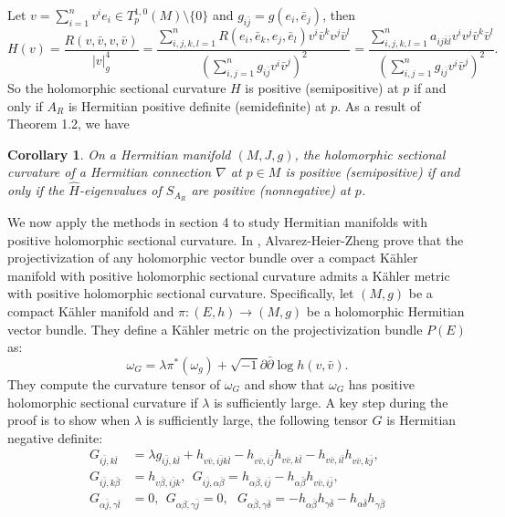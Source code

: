\documentclass[10pt,reqno]{amsart}
\newtheorem{cor}[thm]{Corollary}
\theoremstyle{definition}
\begin{document}
Let $v=\sum_{i=1}^n v^ie_i \in T_p^{1,0}(M)\setminus \{0\}$ and $g_{i\bar{j}}=g(e_i,\bar{e}_j)$, then 
$$H(v)=\dfrac{R(v,\bar{v},v,\bar{v})}{|v|_g^4}=\dfrac{\sum_{i,j,k,l=1}^nR(e_i,\bar{e}_k,e_j,\bar{e}_l)v^i\bar{v}^kv^j\bar{v}^l}{(\sum_{i,j=1}^n g_{i\bar{j}}v^i\bar{v}^j)^2}=\dfrac{\sum_{i,j,k,l=1}^na_{ij\bar{k}\bar{l}}v^iv^j\bar{v}^k\bar{v}^l}{(\sum_{i,j=1}^n g_{i\bar{j}}v^i\bar{v}^j)^2}.$$
So the holomorphic sectional curvature $H$ is positive (semipositive) at $p$ if and only if $A_R$ is Hermitian positive definite (semidefinite) at $p$.
As a result of Theorem 1.2, we have 
\begin{cor}
On a Hermitian manifold $(M,J,g)$, the holomorphic sectional curvature of a Hermitian connection $\nabla$ at $p\in M$  is positive (semipositive) if and only if the $\hat{H}$-eigenvalues of $S_{A_R}$ are positive (nonnegative) at $p$.
\end{cor}
We now apply the methods in section 4 to study Hermitian manifolds with positive holomorphic sectional curvature. In \cite{AHZ}, Alvarez-Heier-Zheng prove that the projectivization of any holomorphic vector bundle over a compact K\"ahler manifold with positive holomorphic sectional curvature admits a K\"ahler metric with positive holomorphic sectional curvature. Specifically, let $(M,g)$ be a compact K\"ahler manifold and $\pi: (E,h)\to (M,g)$ be a holomorphic Hermitian vector bundle. They define a K\"ahler metric on the projectivization bundle $P(E)$ as: $$\omega_G=\lambda \pi^*(\omega_g)+\sqrt{-1}\partial\bar{\partial}\log h(v,\bar{v}).$$ 
They compute the curvature tensor of $\omega_G$ and show that $\omega_G$ has positive holomorphic sectional curvature if $\lambda$ is sufficiently large. A key step during the proof is to show when $\lambda$ is sufficiently large, the following tensor $G$ is Hermitian negative definite:
\begin{align*} G_{i\bar{j},k\bar{l}}&=\lambda g_{i\bar{j},k\bar{l}}+h_{v\bar{v},i\bar{j}k\bar{l}}-h_{v\bar{v},i\bar{j}}h_{v\bar{v},k\bar{l}}-h_{v\bar{v},i\bar{l}}h_{v\bar{v},k\bar{j}},\\
G_{i\bar{j},k\bar{\beta}}&=h_{v\bar{\beta},i\bar{j}k},\ \  G_{i\bar{j},\alpha\bar{\beta}}=h_{\alpha\bar{\beta},i\bar{j}}-h_{\alpha\bar{\beta}}h_{v\bar{v},i\bar{j}},\\
 G_{\alpha\bar{j},\gamma\bar{l}}&=0,\ \  G_{\alpha\beta,\gamma\bar{j}}=0,\ \ \
G_{\alpha\bar{\beta},\gamma\bar{\delta}}=-h_{\alpha\bar{\beta}}h_{\gamma\bar{\delta}}-h_{\alpha\bar{\delta}}h_{\gamma\bar{\beta}}
\end{align*}
\end{document}
